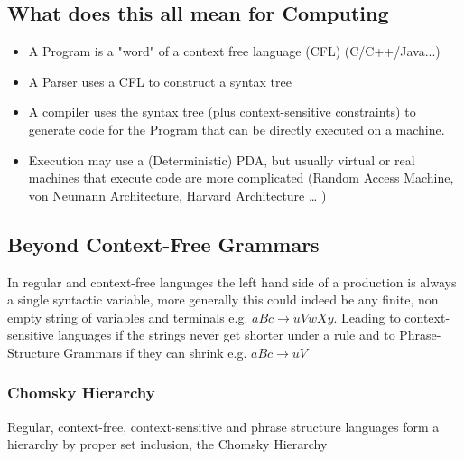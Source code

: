 \subsection{What does this all mean for Computing}
\begin{itemize}
    \item A Program is a "word" of a context free language (CFL) (C/C++/Java...)
    \item A Parser uses a CFL to construct a syntax tree
    \item A compiler uses the syntax tree (plus context-sensitive constraints) to generate code for the Program that can be directly executed on a machine.
    \item Execution may use a (Deterministic) PDA, but usually virtual or real machines that execute code are more complicated (Random Access Machine, von Neumann Architecture, Harvard Architecture … )
\end{itemize}
\subsection{Beyond Context-Free Grammars}
In regular and context-free languages the left hand side of a production is always a single syntactic variable, more generally this could indeed be any finite, non empty string of variables and terminals e.g. $aBc \rightarrow uVwXy$. Leading to context-sensitive languages if the strings never get shorter under a rule and to Phrase-Structure Grammars if they can shrink e.g. $aBc \rightarrow uV$
\subsubsection{Chomsky Hierarchy}
Regular, context-free, context-sensitive and phrase structure languages form a hierarchy by proper set inclusion, the Chomsky Hierarchy


